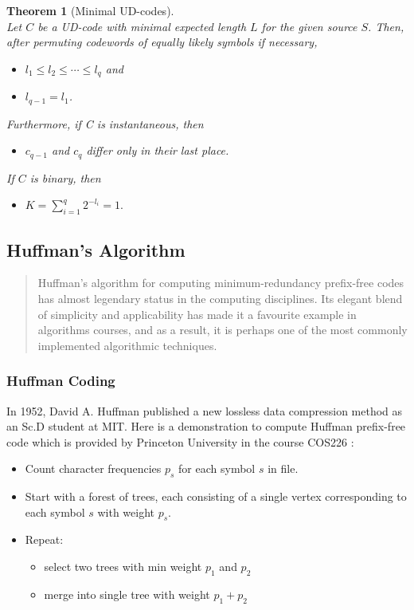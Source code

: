 \documentclass{article}
\newtheorem{theorem}{Theorem}[section]
\begin{document}
\begin{theorem}[Minimal UD-codes]
	\mbox{}\\
	Let $C$ be a UD-code with minimal expected length $L$ for the given source $S$. Then, after permuting codewords of equally likely symbols if necessary,
	\begin{itemize}
		\item $l_{1} \leq l_{2} \leq \cdots \leq l_{q}$ and
		\item $l_{q-1}=l_{1}$.
	\end{itemize}
	Furthermore, if C is instantaneous, then
	\begin{itemize}
		\item $c_{q-1}$ and $c_{q}$ differ only in their last place.
	\end{itemize}
	If $C$ is binary, then
	\begin{itemize}
		\item $K=\sum_{i=1}^{q}2^{-l_{i}}=1.$
	\end{itemize}
\end{theorem}

\subsection{Huffman's Algorithm}

\begin{quotation}
	Huffman’s algorithm for computing minimum-redundancy prefix-free codes has almost legendary status in the computing disciplines. Its elegant blend of simplicity and applicability has made it a favourite example in algorithms courses, and as a result, it is perhaps one of the most commonly implemented algorithmic techniques. \cite{umelHuf}
\end{quotation}

\subsubsection{Huffman Coding}

In 1952, David A. Huffman \cite{huf52} published a new lossless data compression method as an Sc.D student at MIT. Here is a demonstration to compute Huffman prefix-free code which is provided by Princeton University in the course COS226 \cite{huffAlgo}:

\begin{itemize}
	\item Count character frequencies $p_{s}$ for each symbol $s$ in file.
	\item Start with a forest of trees, each consisting of a single vertex corresponding to each symbol $s$ with weight $p_{s}$.
	\item Repeat:
		\begin{itemize}
			\item select two trees with min weight $p_{1}$ and $p_{2}$
			\item merge into single tree with weight $p_{1}+p_{2}$
		\end{itemize}
\end{itemize}
\end{document}
